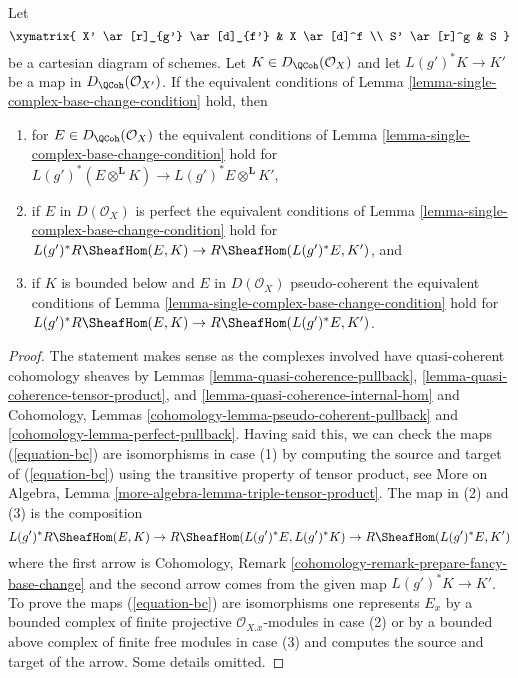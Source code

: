 \begin{lemma}
\label{lemma-single-complex-base-change-condition-inherited}
Let
$$
\xymatrix{
X' \ar[r]_{g'} \ar[d]_{f'} &
X \ar[d]^f \\
S' \ar[r]^g &
S
}
$$
be a cartesian diagram of schemes. Let $K \in D_\QCoh(\mathcal{O}_X)$
and let $L(g')^*K \to K'$ be a map in $D_\QCoh(\mathcal{O}_{X'})$.
If the equivalent conditions of
Lemma \ref{lemma-single-complex-base-change-condition} hold, then
\begin{enumerate}
\item for $E \in D_\QCoh(\mathcal{O}_X)$ the equivalent
conditions of Lemma \ref{lemma-single-complex-base-change-condition} hold
for $L(g')^*(E \otimes^\mathbf{L} K) \to L(g')^*E \otimes^\mathbf{L} K'$,
\item if $E$ in $D(\mathcal{O}_X)$ is perfect the equivalent conditions of
Lemma \ref{lemma-single-complex-base-change-condition} hold for
$L(g')^*R\SheafHom(E, K) \to R\SheafHom(L(g')^*E, K')$, and
\item if $K$ is bounded below and $E$ in $D(\mathcal{O}_X)$
pseudo-coherent the equivalent conditions of
Lemma \ref{lemma-single-complex-base-change-condition} hold for
$L(g')^*R\SheafHom(E, K) \to R\SheafHom(L(g')^*E, K')$.
\end{enumerate}
\end{lemma}

\begin{proof}
The statement makes sense as the complexes involved have quasi-coherent
cohomology sheaves by Lemmas
\ref{lemma-quasi-coherence-pullback},
\ref{lemma-quasi-coherence-tensor-product}, and
\ref{lemma-quasi-coherence-internal-hom} and
Cohomology, Lemmas \ref{cohomology-lemma-pseudo-coherent-pullback} and
\ref{cohomology-lemma-perfect-pullback}.
Having said this, we can check the maps (\ref{equation-bc})
are isomorphisms in case (1) by computing the source and target
of (\ref{equation-bc}) using the transitive property of tensor product, see
More on Algebra, Lemma \ref{more-algebra-lemma-triple-tensor-product}.
The map in (2) and (3) is the composition
$$
L(g')^*R\SheafHom(E, K) \to R\SheafHom(L(g')^*E, L(g')^*K)
\to R\SheafHom(L(g')^*E, K')
$$
where the first arrow is
Cohomology, Remark \ref{cohomology-remark-prepare-fancy-base-change}
and the second arrow comes from the given map $L(g')^*K \to K'$.
To prove the maps (\ref{equation-bc}) are isomorphisms one represents
$E_x$ by a bounded complex of finite projective $\mathcal{O}_{X. x}$-modules
in case (2) or by a bounded above complex of finite free modules in case (3)
and computes the source and target of the arrow.
Some details omitted.
\end{proof}

